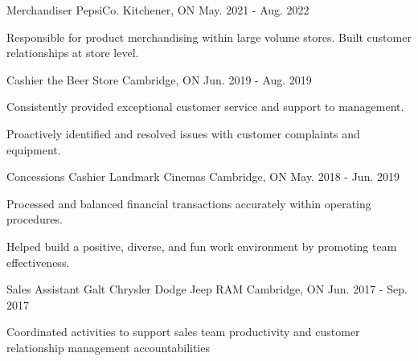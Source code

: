 


\begin{cventries}


\cventry
{Merchandiser} %
{PepsiCo.} %
{Kitchener, ON} %
{May. 2021 - Aug. 2022} %
{ %
\begin{cvitems}
\item {Responsible for product merchandising within large volume stores. Built customer relationships at store level.}
\end{cvitems}
}


\cventry
{Cashier} %
{the Beer Store} %
{Cambridge, ON} %
{Jun. 2019 - Aug. 2019} %
{ %
\begin{cvitems}
\item {Consistently provided exceptional customer service and support to management.}
\item {Proactively identified and resolved issues with customer complaints and equipment.}
\end{cvitems}
}


\cventry
{Concessions Cashier} %
{Landmark Cinemas} %
{Cambridge, ON} %
{May. 2018 - Jun. 2019} %
{ %
\begin{cvitems}
\item {Processed and balanced financial transactions accurately within operating procedures.}
\item {Helped build a positive, diverse, and fun work environment by promoting team effectiveness.}
\end{cvitems} 
}


\cventry
{Sales Assistant} %
{Galt Chrysler Dodge Jeep RAM} %
{Cambridge, ON} %
{Jun. 2017 - Sep. 2017} %
{ %
\begin{cvitems}
\item {Coordinated activities to support sales team productivity and customer relationship management accountabilities}
\end{cvitems}
}

\end{cventries}